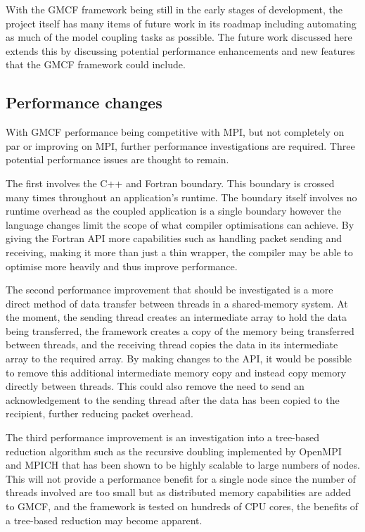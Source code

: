 With the GMCF framework being still in the early stages of development, the
project itself has many items of future work in its roadmap including automating
as much of the model coupling tasks as possible. The future work discussed here
extends this by discussing potential performance enhancements and new features
that the GMCF framework could include.

\subsection{Performance changes}

With GMCF performance being competitive with MPI, but not completely on par or
improving on MPI, further performance investigations are required. Three
potential performance issues are thought to remain.

The first involves the C++ and Fortran boundary. This boundary is crossed many
times throughout an application's runtime. The boundary itself involves no
runtime overhead as the coupled application is a single boundary however the
language changes limit the scope of what compiler optimisations can achieve. By
giving the Fortran API more capabilities such as handling packet sending and
receiving, making it more than just a thin wrapper, the compiler may be able to
optimise more heavily and thus improve performance.

The second performance improvement that should be investigated is a more direct
method of data transfer between threads in a shared-memory system. At the
moment, the sending thread creates an intermediate array to hold the data being
transferred, the framework creates a copy of the memory being transferred
between threads, and the receiving thread copies the data in its intermediate
array to the required array. By making changes to the API, it would be possible
to remove this additional intermediate memory copy and instead copy memory
directly between threads. This could also remove the need to send an
acknowledgement to the sending thread after the data has been copied to the
recipient, further reducing packet overhead.

The third performance improvement is an investigation into a tree-based
reduction algorithm such as the recursive doubling implemented by OpenMPI and
MPICH that has been shown to be highly scalable to large numbers of
nodes\cite{Thakur2003}. This will not provide a performance benefit for a single
node since the number of threads involved are too small but as distributed
memory capabilities are added to GMCF, and the framework is tested on hundreds
of CPU cores, the benefits of a tree-based reduction may become apparent.

